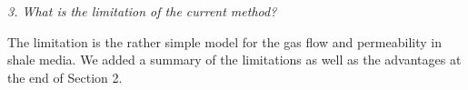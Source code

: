 \documentclass{elsarticle}
\newcommand{\review}[1]{ \textit{#1}}
\begin{document}
{{%


\bigskip

    \review{3. What is the limitation of the current method? }


The limitation is the rather simple model for the gas flow and permeability in shale media. We added a summary of the limitations as well as the advantages at the end of Section 2.

}}
\end{document}

